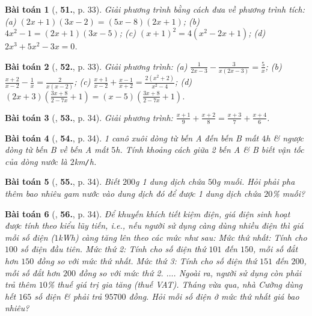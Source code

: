\documentclass{article}
\numberwithin{equation}{section}
\newtheorem{baitoan}{Bài toán}
\begin{document}
\begin{baitoan}[\cite{SGK_Toan_8_tap_2}, \textbf{51.}, p. 33]
	Giải phương trình bằng cách đưa về phương trình tích: (a) $(2x + 1)(3x - 2) = (5x - 8)(2x + 1)$; (b) $4x^2 - 1 = (2x + 1)(3x - 5)$; (c) $(x + 1)^2 = 4(x^2 - 2x + 1)$; (d) $2x^3 + 5x^2 - 3x = 0$.
\end{baitoan}

\begin{baitoan}[\cite{SGK_Toan_8_tap_2}, \textbf{52.}, p. 33]
	Giải phương trình: (a) $\frac{1}{2x - 3} - \frac{3}{x(2x - 3)} = \frac{5}{x}$; (b) $\frac{x + 2}{x - 2} - \frac{1}{x} = \frac{2}{x(x - 2)}$; (c) $\frac{x + 1}{x - 2} + \frac{x - 1}{x + 2} = \frac{2(x^2 + 2)}{x^2 - 4}$; (d) $(2x + 3)\left(\frac{3x + 8}{2 - 7x} + 1\right) = (x - 5)\left(\frac{3x + 8}{2 - 7x} + 1\right)$.
\end{baitoan}

\begin{baitoan}[\cite{SGK_Toan_8_tap_2}, \textbf{53.}, p. 34]
	Giải phương trình: $\frac{x + 1}{9} + \frac{x + 2}{8} = \frac{x + 3}{7} + \frac{x + 4}{6}$.
\end{baitoan}

\begin{baitoan}[\cite{SGK_Toan_8_tap_2}, \textbf{54.}, p. 34]
	1 canô xuôi dòng từ bến A đến bến B mất $4$\emph{h} \& ngược dòng từ bến B về bến A mất $5$\emph{h}. Tính khoảng cách giữa 2 bến A \& B biết vận tốc của dòng nước là $2$\emph{km\texttt{/}h}. 
\end{baitoan}

\begin{baitoan}[\cite{SGK_Toan_8_tap_2}, \textbf{55.}, p. 34]
	Biết $200$\emph{g} 1 dung dịch chứa $50$\emph{g} muối. Hỏi phải pha thêm bao nhiêu gam nước vào dung dịch đó để được 1 dung dịch chứa $20$\% muối?
\end{baitoan}

\begin{baitoan}[\cite{SGK_Toan_8_tap_2}, \textbf{56.}, p. 34]
	Để khuyến khích tiết kiệm điện, giá điện sinh hoạt được tính theo kiểu lũy tiến, i.e., nếu người sử dụng càng dùng nhiều điện thì giá mỗi số điện ($1$kWh) càng tăng lên theo các mức như sau: Mức thứ nhất: Tính cho $100$ số điện đầu tiên. Mức thứ 2: Tính cho số điện thứ $101$ đến $150$, mỗi số đắt hơn $150$ đồng so với mức thứ nhất. Mức thứ 3: Tính cho số điện thứ $151$ đến $200$, mỗi số đắt hơn $200$ đồng so với mức thứ 2. $\ldots$. Ngoài ra, người sử dụng còn phải trả thêm $10$\% thuế giá trị gia tăng (thuế VAT). Tháng vừa qua, nhà Cường dùng hết $165$ số điện \& phải trả $95700$ đồng. Hỏi mỗi số điện ở mức thứ nhất giá bao nhiêu?
\end{baitoan}
\end{document}
